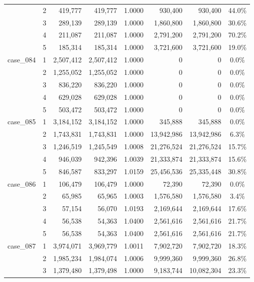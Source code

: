 \begin{footnotesize}
\begin{longtable}{l c rr c rr c}
 & 2 & 419{,}777 & 419{,}777 & 1.0000 & 930{,}400 & 930{,}400 & 44.0\% \\
 & 3 & 289{,}139 & 289{,}139 & 1.0000 & 1{,}860{,}800 & 1{,}860{,}800 & 30.6\% \\
 & 4 & 211{,}087 & 211{,}087 & 1.0000 & 2{,}791{,}200 & 2{,}791{,}200 & 70.2\% \\
 & 5 & 185{,}314 & 185{,}314 & 1.0000 & 3{,}721{,}600 & 3{,}721{,}600 & 19.0\% \\
\addlinespace[2pt]
case\_084 & 1 & 2{,}507{,}412 & 2{,}507{,}412 & 1.0000 & 0 & 0 & 0.0\% \\
 & 2 & 1{,}255{,}052 & 1{,}255{,}052 & 1.0000 & 0 & 0 & 0.0\% \\
 & 3 & 836{,}220 & 836{,}220 & 1.0000 & 0 & 0 & 0.0\% \\
 & 4 & 629{,}028 & 629{,}028 & 1.0000 & 0 & 0 & 0.0\% \\
 & 5 & 503{,}472 & 503{,}472 & 1.0000 & 0 & 0 & 0.0\% \\
\addlinespace[2pt]
case\_085 & 1 & 3{,}184{,}152 & 3{,}184{,}152 & 1.0000 & 345{,}888 & 345{,}888 & 0.0\% \\
 & 2 & 1{,}743{,}831 & 1{,}743{,}831 & 1.0000 & 13{,}942{,}986 & 13{,}942{,}986 & 6.3\% \\
 & 3 & 1{,}246{,}519 & 1{,}245{,}549 & 1.0008 & 21{,}276{,}524 & 21{,}276{,}524 & 15.7\% \\
 & 4 & 946{,}039 & 942{,}396 & 1.0039 & 21{,}333{,}874 & 21{,}333{,}874 & 15.6\% \\
 & 5 & 846{,}587 & 833{,}297 & 1.0159 & 25{,}456{,}536 & 25{,}335{,}448 & 30.8\% \\
\addlinespace[2pt]
case\_086 & 1 & 106{,}479 & 106{,}479 & 1.0000 & 72{,}390 & 72{,}390 & 0.0\% \\
 & 2 & 65{,}985 & 65{,}965 & 1.0003 & 1{,}576{,}580 & 1{,}576{,}580 & 3.4\% \\
 & 3 & 57{,}154 & 56{,}070 & 1.0193 & 2{,}169{,}644 & 2{,}169{,}644 & 17.6\% \\
 & 4 & 56{,}538 & 54{,}363 & 1.0400 & 2{,}561{,}616 & 2{,}561{,}616 & 21.7\% \\
 & 5 & 56{,}538 & 54{,}363 & 1.0400 & 2{,}561{,}616 & 2{,}561{,}616 & 21.7\% \\
\addlinespace[2pt]
case\_087 & 1 & 3{,}974{,}071 & 3{,}969{,}779 & 1.0011 & 7{,}902{,}720 & 7{,}902{,}720 & 18.3\% \\
 & 2 & 1{,}985{,}234 & 1{,}984{,}074 & 1.0006 & 9{,}999{,}360 & 9{,}999{,}360 & 26.8\% \\
 & 3 & 1{,}379{,}480 & 1{,}379{,}498 & 1.0000 & 9{,}183{,}744 & 10{,}082{,}304 & 23.3\% \\

\end{longtable}
\end{footnotesize}
